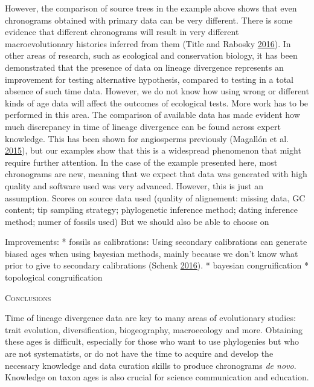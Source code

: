\documentclass[]{article}
\begin{document}
However, the comparison of source trees in the example above shows that even chronograms obtained with primary data can be very different. There is some evidence that different chronograms will result in very different macroevolutionary histories inferred from them (Title and Rabosky \protect\hyperlink{ref-title2016macrophylogenies}{2016}). In other areas of research, such as ecological and conservation biology, it has been demonstrated that the presence of data on lineage divergence represents an improvement for testing alternative hypothesis, compared to testing in a total absence of such time data. However, we do not know how using wrong or different kinds of age data will affect the outcomes of ecological tests. More work has to be performed in this area.
The comparison of available data has made evident how much discrepancy in time of lineage divergence can be found across expert knowledge. This has been shown for angiosperms previously (Magallón et al. \protect\hyperlink{ref-magallon2015metacalibrated}{2015}), but our examples show that this is a widespread phenomenon that might require further attention.
In the case of the example presented here, most chronograms are new, meaning that we expect that data was generated with high quality and software used was very advanced. However, this is just an assumption. Scores on source data used (quality of alignement: missing data, GC content; tip sampling strategy; phylogenetic inference method; dating inference method; numer of fossils used) But we should also be able to choose on

Improvements:
* fossils as calibrations: Using secondary calibrations can generate biased ages when using bayesian methods, mainly because we don't know what prior to give to secondary calibrations
(Schenk \protect\hyperlink{ref-Schenk2016}{2016}).
* bayesian congruification
* topological congruification

\begin{center}
\textsc{Conclusions}
\end{center}

Time of lineage divergence data are key to many areas of evolutionary studies: trait evolution,
diversification, biogeography, macroecology and more. Obtaining these ages is difficult,
especially for those who want to use phylogenies but who are not systematists, or
do not have the time to acquire and develop the necessary knowledge and data curation skills
to produce chronograms \emph{de novo}. Knowledge on taxon ages is also crucial for
science communication and education.
\end{document}
